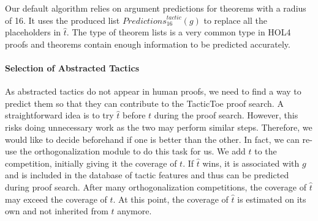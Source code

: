 \documentclass[runningheads,a4paper,draft]{svjour3}
\def\holfour{\textsf{HOL4}\xspace}
\def\tactictoe{\textsf{TacticToe}\xspace}
\begin{document}
Our default algorithm relies on argument predictions for theorems with a
radius of 16. It uses the produced list
$\mathit{Predictions}^{\mathit{tactic}}_{16}(g)$ to replace all the
placeholders
in $\hat{t}$.
The type of theorem lists is a very common type in \holfour proofs and theorems contain
enough information to be predicted accurately.


\paragraph{Selection of Abstracted Tactics}
As abstracted tactics do not appear in human proofs, we need to find a way to
predict them so that they can contribute to the \tactictoe proof search.
A straightforward idea is to try $\hat{t}$ before $t$ during the proof search.
However, this risks doing unnecessary work as the two may perform similar steps.
Therefore, we would like to decide
beforehand if one is better than the other.
In fact, we can re-use the orthogonalization module to do this task for us.
We add $\hat{t}$ to the competition, initially giving it the coverage of $t$.
If $\hat{t}$
wins, it is associated with $g$ and is included in the database of tactic
features and thus can be predicted during proof search.
After many orthogonalization competitions, the coverage of $\hat{t}$ may exceed
the coverage of
$t$. At
this point, the coverage of $\hat{t}$ is estimated on its own and not inherited
from
$t$ anymore.
\end{document}
